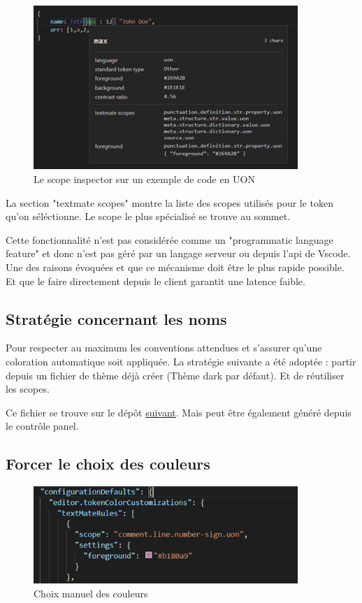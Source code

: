 \documentclass[
    iict, %
    il, %
]{heig-tb}
\begin{document}
\begin{figure}[!ht]
    \begin{center}
        \includegraphics[width=10cm]{assets/figures/scope-inspector.png}
    \end{center}
    \caption[Scope inspector]{\label{basic-uon} Le scope inspector sur un exemple de code en UON}
\end{figure}

La section "textmate scopes" montre la liste des scopes utilisés pour le token qu'on séléctionne. Le scope le plus spécialisé se trouve au sommet.

Cette fonctionnalité n'est pas considérée comme un "programmatic language feature" et donc n'est pas géré par un langage serveur ou depuis l'api de Vscode. Une des raisons évoquées et que ce mécanisme doit être le plus rapide possible. Et que le faire directement depuis le client garantit une latence faible.

\subsection{Stratégie concernant les noms}
Pour respecter au maximum les conventions attendues et s'assurer qu'une coloration automatique soit appliquée. La stratégie suivante a été adoptée : partir depuis un fichier de thème déjà créer (Thème dark par défaut). Et de réutiliser les scopes.

Ce fichier se trouve sur le dépôt \href{https://github.com/microsoft/vscode/blob/main/extensions/theme-defaults/themes/dark_vs.json}{suivant}.
Mais peut être également généré depuis le contrôle panel.

\subsection{Forcer le choix des couleurs}
\begin{figure}[!ht]
    \begin{center}
        \includegraphics[width=10cm]{assets/figures/manual-settings-color.png}
    \end{center}
    \caption[Choix manuel des couleurs]{\label{manual-settings-color} Choix manuel des couleurs}
\end{figure}
\end{document}

